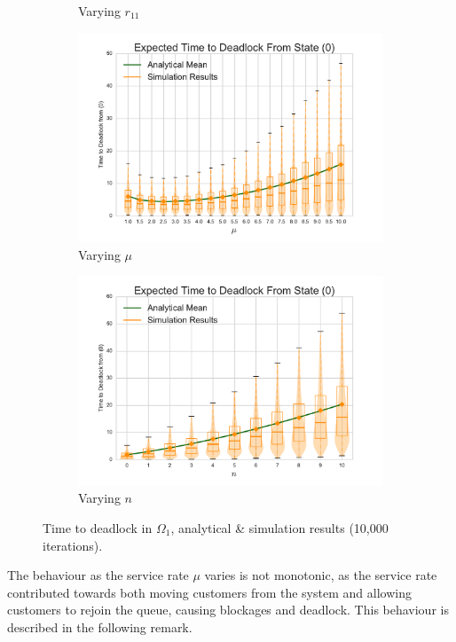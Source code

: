 \documentclass{article}
\begin{document}
\begin{figure}[!htbp]
\begin{subfigure}[b]{0.5\textwidth}
  \caption{Varying $r_{11}$}
  \label{fig:timestodeadlock_r11}
\end{subfigure}
\begin{subfigure}[b]{0.5\textwidth}
  \includegraphics[width=\textwidth]{images/varymu}
  \caption{Varying $\mu$}
  \label{fig:timestodeadlock_mu}
\end{subfigure}
\begin{subfigure}[b]{0.5\textwidth}
  \includegraphics[width=\textwidth]{images/varyn}
  \caption{Varying $n$}
  \label{fig:timestodeadlock_n}
\end{subfigure}
\caption{Time to deadlock in $\Omega_1$, analytical \& simulation results (10,000 iterations).}
\label{fig:timestodeadlock}
\end{figure}

The behaviour as the service rate $\mu$ varies is not monotonic, as the service rate contributed towards both moving customers from the system and allowing customers to rejoin the queue, causing blockages and deadlock.
This behaviour is described in the following remark.\\
\end{document}
